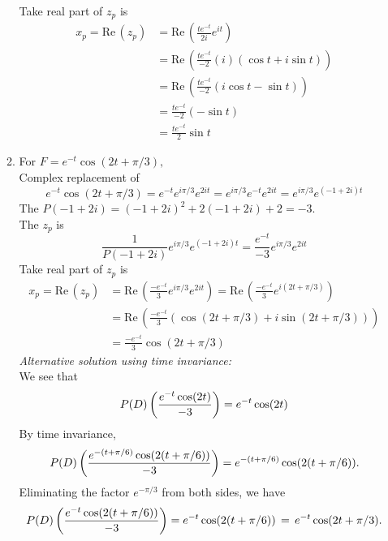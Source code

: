 \begin{enumerate}
\begin{enumerate}[label=(\alph*)]
    Take real part of $z _p$ is
    \begin{align*}
      x _p = \mathrm{Re\, }(z_p)
      &= \mathrm{Re\, } \left( \frac{te^{-t}}{2i} e^{it} \right) \\
      &= \mathrm{Re\, } \left( \frac{te^{-t}}{-2} (i)
        \left( \cos t + i \sin t \right) \right) \\
      &= \mathrm{Re\, } \left( \frac{te^{-t}}{-2}
         \left( i \cos t - \sin t \right) \right) \\
      &= \frac{te^{-t}}{-2} \left( - \sin t \right) \\
      &= \frac{te^{-t}}{2} \sin t 
    \end{align*}
  \item For $F=e^{-t}\cos (2t+\pi /3),\,$\\
    Complex replacement of
    \begin{equation*}
      e^{-t}\cos (2t+ \pi /3) = e^{-t} e^{i \pi /3} e^{2it}
      = e^{i \pi /3} e^{-t} e^{2it} = e^{i \pi /3} e^{(-1 + 2i)t}
    \end{equation*}
    The $P(-1 + 2i) = (-1 + 2i)^2 + 2(-1 + 2i) + 2 = -3$. \\
    The $z _p$ is
    \begin{equation*}
      \frac{1}{P(-1 + 2i)}e^{i \pi /3}e^{(-1 + 2i)t} = \frac{e^{-t}}{-3} e^{i \pi /3}e^{2it}
    \end{equation*}
    Take real part of $z _p$ is
    \begin{align*}
      x _p = \mathrm{Re\, }(z_p)
      &= \mathrm{Re\, }
        \left( \frac{-e^{-t}}{3} e^{i \pi /3}e^{2it} \right)  =
      \mathrm{Re\, } \left( \frac{-e^{-t}}{3} e^{i(2t + \pi /3)} \right)\\
      &= \mathrm{Re\, }
        \left( \frac{-e^{-t}}{3} 
        \left( \cos (2t + \pi /3) + i \sin (2t + \pi /3) \right) \right) \\
      &= \frac{-e^{-t}}{3}  \cos (2t  + \pi /3)        
    \end{align*}
    \emph{Alternative solution using time invariance:}\\
    We see that
    \begin{equation*}
      \displaystyle  \displaystyle P(D) \left( \frac{e^{-t} \cos (2t)}{-3}\right)
      \displaystyle =
      \displaystyle e^{-t}\cos (2t)
    \end{equation*}
    By time invariance,
    \begin{equation*}
      \displaystyle  \displaystyle P(D) \left( \frac{e^{-(t+\pi /6)} \cos (2(t+\pi /6))}{-3}\right)
      \displaystyle =
      \displaystyle e^{-(t+\pi /6)} \cos (2(t+\pi /6)).
    \end{equation*}
    Eliminating the factor $e^{-\pi / 3}$ from both sides, we have
    \begin{equation*}
      \displaystyle  \displaystyle P(D) \left( \frac{e^{-t} \cos (2(t+\pi /6))}{-3}\right)
      \displaystyle =
      \displaystyle e^{-t} \cos (2(t+\pi /6))\, =\, e^{-t} \cos (2t+\pi /3).
    \end{equation*}
    

\end{enumerate}
\end{enumerate}
